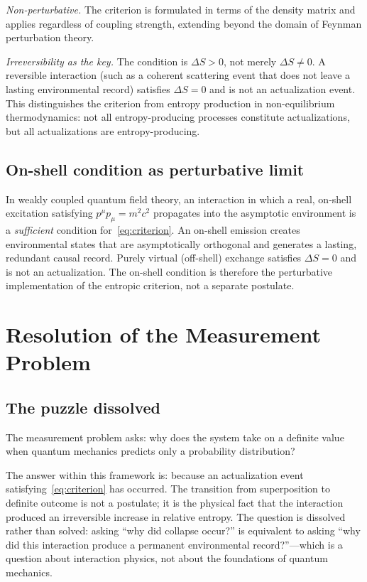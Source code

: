 \documentclass[11pt,twocolumn]{article}
\begin{document}
\emph{Non-perturbative.}
The criterion is formulated in terms of the density matrix and
applies regardless of coupling strength, extending beyond the
domain of Feynman perturbation theory.

\emph{Irreversibility as the key.}
The condition is $\Delta S > 0$, not merely $\Delta S \ne 0$.
A reversible interaction (such as a coherent scattering event
that does not leave a lasting environmental record) satisfies
$\Delta S = 0$ and is not an actualization event. This
distinguishes the criterion from entropy production in
non-equilibrium thermodynamics: not all entropy-producing
processes constitute actualizations, but all actualizations
are entropy-producing.

\subsection{On-shell condition as perturbative limit}

In weakly coupled quantum field theory, an interaction in which
a real, on-shell excitation satisfying $p^\mu p_\mu = m^2 c^2$
propagates into the asymptotic environment is a \emph{sufficient}
condition for~\eqref{eq:criterion}.
An on-shell emission creates environmental states that are
asymptotically orthogonal and generates a lasting, redundant
causal record.
Purely virtual (off-shell) exchange satisfies $\Delta S = 0$
and is not an actualization.
The on-shell condition is therefore the perturbative implementation
of the entropic criterion, not a separate postulate.

\section{Resolution of the Measurement Problem}
\label{sec:resolution}

\subsection{The puzzle dissolved}

The measurement problem asks: why does the system take on a
definite value when quantum mechanics predicts only a probability
distribution?

The answer within this framework is: because an actualization
event satisfying~\eqref{eq:criterion} has occurred.
The transition from superposition to definite outcome is not a
postulate; it is the physical fact that the interaction produced
an irreversible increase in relative entropy.
The question is dissolved rather than solved: asking
``why did collapse occur?'' is equivalent to asking ``why did this
interaction produce a permanent environmental record?''---which is
a question about interaction physics, not about the foundations
of quantum mechanics.
\end{document}
